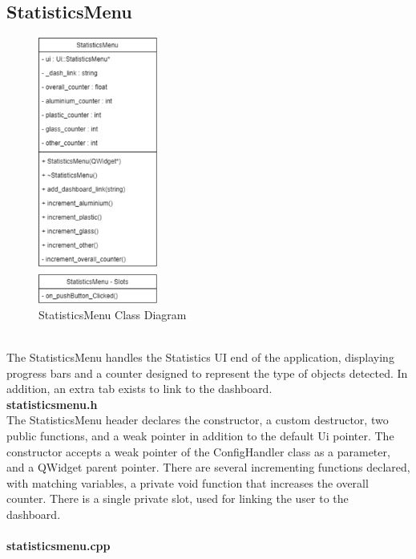 \documentclass[conference]{IEEEtran}
\begin{document}
\subsection{StatisticsMenu}

\begin{figure}[h]
    \centering
    \includegraphics[width=0.35\textwidth]{images/code_diagrams/statisticsmenu.eps}
    \caption{StatisticsMenu Class Diagram}
\end{figure}~\\

The StatisticsMenu handles the Statistics UI end of the application, displaying progress bars and a counter designed to represent the type of objects detected. In addition, an extra tab exists to link to the dashboard.\\


\textbf{statisticsmenu.h}~\\

The StatisticsMenu header declares the constructor, a custom destructor, two public functions, and a weak pointer in addition to the default Ui pointer. The constructor accepts a weak pointer of the ConfigHandler class as a parameter, and a QWidget parent pointer. There are several incrementing functions declared, with matching variables, a private void function that increases the overall counter. There is a single private slot, used for linking the user to the dashboard.~\\~\\


\textbf{statisticsmenu.cpp}~\\
\end{document}
